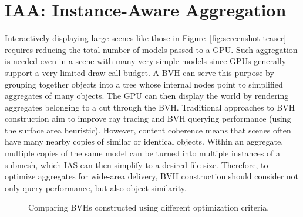 \section{IAA: Instance-Aware Aggregation}
\label{sec:bvhconstruction}

Interactively displaying large scenes like those in
Figure~\ref{fig:screenshot-teaser} requires reducing the total number
of models passed to a GPU. Such aggregation is needed even in a scene
with many very simple models since GPUs generally support a very limited draw
call budget.
A BVH can serve this purpose by grouping together objects into a tree whose
internal nodes point to simplified aggregates of many objects. The GPU can then
display the world by rendering aggregates belonging to a cut through the BVH.
Traditional approaches to BVH construction aim to improve ray tracing and BVH
querying performance (\eg using the surface area heuristic). However, 
content coherence means that scenes often have many nearby copies of similar
or identical objects. Within an aggregate, multiple copies of the same model 
can be turned into multiple instances of a submesh, which IAS can then simplify 
to a desired file size. Therefore, to optimize aggregates for wide-area delivery,
BVH construction should consider not only query
performance, but also object similarity.


\begin{figure}
\centering
{}
\caption{Comparing BVHs constructed using different optimization criteria.}
\label{fig:bvh_optimization}
\vspace{-14pt}
\end{figure}

